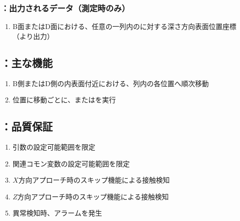 \subsubsection{\DLtwoBD：出力されるデータ（測定時のみ）}
\begin{enumerate}[label*=\sarrow]
\item B面またはD面における、任意の一列内の\Dimple に対する深さ方向表面位置座標\\
（\DMLthreeBD より出力）
\end{enumerate}


\subsection{\DLtwoBD：主な機能}
\begin{enumerate}[label*=\sarrow]
\item B側またはD側の内表面付近における、列内の各\Dimple 位置へ順次移動
\item \Dimple 位置に移動ごとに、\DMLthreeBD または\DKLthreeBD を実行
\end{enumerate}


\subsection{\DLtwoBD：品質保証}
\begin{enumerate}[label*=\sarrow]
\item {}引数の設定可能範囲を限定
\item 関連コモン変数の設定可能範囲を限定
\item $X$方向アプローチ時のスキップ機能による接触検知
\item $Z$方向アプローチ時のスキップ機能による接触検知
\item 異常検知時、アラームを発生
\end{enumerate}


